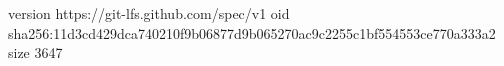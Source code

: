 version https://git-lfs.github.com/spec/v1
oid sha256:11d3cd429dca740210f9b06877d9b065270ac9c2255c1bf554553ce770a333a2
size 3647
